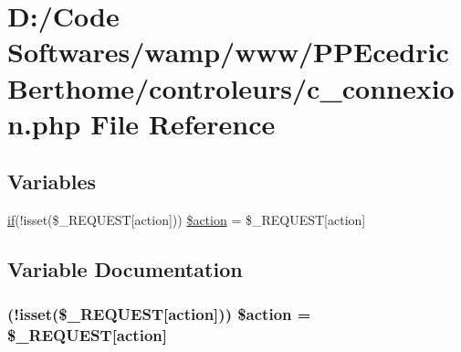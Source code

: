 \hypertarget{c__connexion_8php}{}\section{D\+:/\+Code Softwares/wamp/www/\+P\+P\+Ecedric\+Berthome/controleurs/c\+\_\+connexion.php File Reference}
\label{c__connexion_8php}
\subsection*{Variables}
\begin{DoxyCompactItemize}
\item 
\hyperlink{jquery_8js_a42cbfadee2b4749e8f699ea8d745a0e4}{if}(!isset(\$\+\_\+\+R\+E\+Q\+U\+E\+ST\mbox{[}\textquotesingle{}action\textquotesingle{}\mbox{]})) \hyperlink{c__connexion_8php_a22594a4d032330e912b21f2b3af11a68}{\$action} = \$\+\_\+\+R\+E\+Q\+U\+E\+ST\mbox{[}\textquotesingle{}action\textquotesingle{}\mbox{]}
\end{DoxyCompactItemize}


\subsection{Variable Documentation}
\subsubsection[{\texorpdfstring{\$action}{$action}}]{ (!isset(\$\+\_\+\+R\+E\+Q\+U\+E\+ST\mbox{[}\textquotesingle{}action\textquotesingle{}\mbox{]})) \$action = \$\+\_\+\+R\+E\+Q\+U\+E\+ST\mbox{[}\textquotesingle{}action\textquotesingle{}\mbox{]}}\hypertarget{c__connexion_8php_a22594a4d032330e912b21f2b3af11a68}{}\label{c__connexion_8php_a22594a4d032330e912b21f2b3af11a68}
